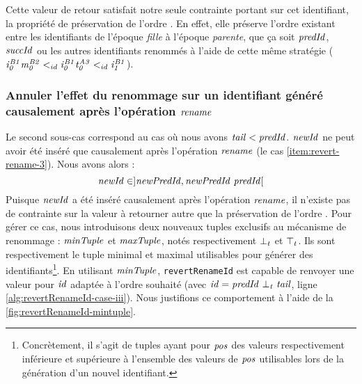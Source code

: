 Cette valeur de retour satisfait notre seule contrainte portant sur cet identifiant, \ie la propriété de préservation de l'ordre .
En effet, elle préserve l'ordre existant entre les identifiants de l'époque \emph{fille} à l'époque \emph{parente}, que ça soit $\mathit{predId}$, $\mathit{succId}$ ou les autres identifiants renommés à l'aide de cette même stratégie (\eg $\mathit{i}^{\mathit{B1}}_{\mathit{0}}\mathit{m}^{\mathit{B2}}_{\mathit{0}} <_{id} \mathit{i}^{\mathit{B1}}_{\mathit{0}}\mathit{t}^{\mathit{A3}}_{\mathit{0}} <_{id} \mathit{i}^{\mathit{B1}}_{\mathit{1}}$).

\subsubsection{Annuler l'effet du renommage sur un identifiant généré causalement après l'opération $\mathit{rename}$}

Le second sous-cas correspond au cas où nous avons $\mathit{tail} < \mathit{predId}$.
$\mathit{newId}$ ne peut avoir été inséré que causalement après l'opération $\mathit{rename}$ (\ie le cas \ref{item:revert-rename-3}).
Nous avons alors :
\[\mathit{newId} \in ]\mathit{newPredId}, \mathit{newPredId~predId}[\]
Puisque $\mathit{newId}$ a été inséré causalement après l'opération $\mathit{rename}$, il n'existe pas de contrainte sur la valeur à retourner autre que la préservation de l'ordre .
Pour gérer ce cas, nous introduisons deux nouveaux tuples exclusifs au mécanisme de renommage : $\mathit{minTuple}$ et $\mathit{maxTuple}$, notés respectivement $\bot_t$ et $\top_t$.
Ils sont respectivement le tuple minimal et maximal utilisables pour générer des identifiants\footnote{Concrètement, il s'agit de tuples ayant pour $\mathit{pos}$ des valeurs respectivement inférieure et supérieure à l'ensemble des valeurs de $\mathit{pos}$ utilisables lors de la génération d'un nouvel identifiant.}.
En utilisant $\mathit{minTuple}$, \texttt{revertRenameId} est capable de renvoyer une valeur pour $\mathit{id}$ adaptée à l'ordre souhaité (avec $\mathit{id} = \mathit{predId~\bot_t~tail}$, ligne \ref{alg:revertRenameId-case-iii}).
Nous justifions ce comportement à l'aide de la \autoref{fig:revertRenameId-mintuple}.

